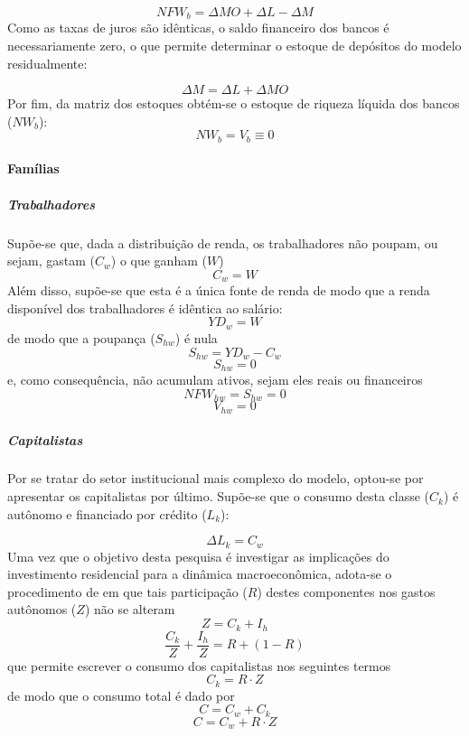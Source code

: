 $$
NFW_b = \Delta MO + \Delta L - \Delta M
$$
Como as taxas de juros são idênticas, o saldo financeiro dos bancos é necessariamente zero, o que permite determinar o estoque de depósitos do modelo residualmente:

\begin{equation}
\label{_M}
    \Delta M = \Delta L + \Delta MO
\end{equation}
Por fim, da matriz dos estoques obtém-se o estoque de riqueza líquida dos bancos ($NW_b$):
\begin{equation}
    NW_b = V_b \equiv 0
\end{equation}

\paragraph*{Famílias} 

\subparagraph*{Trabalhadores}

Supõe-se que, dada a distribuição de renda, os trabalhadores não poupam, ou sejam, gastam ($C_w$) o que ganham ($W$)
\begin{equation}
C_w = W
\end{equation}
Além disso, supõe-se que esta é a única fonte de renda de modo que a renda disponível dos trabalhadores é idêntica ao salário:
\begin{equation}
YD_w = W
\end{equation}
de modo que a poupança ($S_{hw}$) é nula 
\begin{equation}
S_{hw} = YD_w - C_w
\end{equation}
$$
S_{hw} = 0
$$
e, como consequência, não acumulam ativos, sejam eles reais ou financeiros
\begin{equation}
NFW_{hw} = S_{hw} = 0
\end{equation}
\begin{equation}
V_{hw} = 0
\end{equation}

\subparagraph*{Capitalistas}

Por se tratar do setor institucional mais complexo do modelo, optou-se por apresentar os capitalistas por último. Supõe-se que o consumo desta classe ($C_k$) é autônomo e financiado por crédito ($L_k$):

\begin{equation}
\Delta L_k = C_w
\end{equation}
Uma vez que o objetivo desta pesquisa é investigar as implicações do investimento residencial para a dinâmica macroeconômica, adota-se o procedimento de \textcite{freitas_baseline_2019} em que tais participação ($R$) destes componentes nos gastos autônomos ($Z$) não se alteram
\begin{equation}
\label{_Z}
Z = C_k + I_h
\end{equation}
$$
\frac{C_k}{Z} + \frac{I_h}{Z} = R + (1-R)
$$
que permite escrever o consumo dos capitalistas nos seguintes termos
\begin{equation}
\label{_Ck}
    C_k = R\cdot Z
\end{equation}
de modo que o consumo total é dado por
\begin{equation}
\label{ConsumoTotal}
C = C_w + C_k
\end{equation}
$$
C = C_w + R\cdot Z
$$

